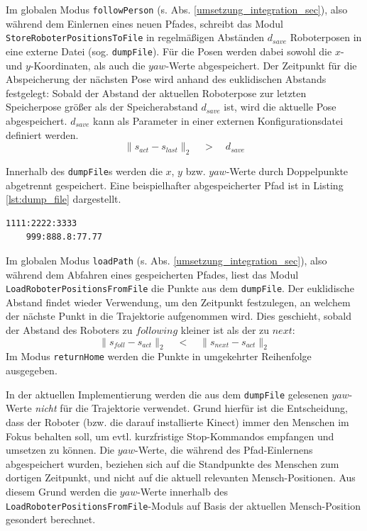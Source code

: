 Im globalen Modus \lstinline{followPerson} (s. Abs. \ref{umsetzung_integration_sec}), also während dem Einlernen eines neuen Pfades, schreibt das Modul \lstinline{StoreRoboterPositionsToFile} in regelmäßigen Abständen $d_{save}$ Roboterposen in eine externe Datei (sog. \lstinline{dumpFile}).
Für die Posen werden dabei sowohl die $x$- und $y$-Koordinaten, als auch die $yaw$-Werte abgespeichert.
Der Zeitpunkt für die Abspeicherung der nächsten Pose wird anhand des euklidischen Abstands festgelegt:
Sobald der Abstand der aktuellen Roboterpose zur letzten Speicherpose größer als der Speicherabstand $d_{save}$ ist, wird die aktuelle Pose abgespeichert.
$d_{save}$ kann als Parameter in einer externen Konfigurationsdatei definiert werden.
\begin{equation}
	\| s_{act} - s_{last}\|_2 \quad > \quad d_{save}
\end{equation}

Innerhalb des \lstinline{dumpFile}s werden die $x$, $y$ bzw. $yaw$-Werte durch Doppelpunkte abgetrennt gespeichert.
Eine beispielhafter abgespeicherter Pfad ist in Listing \ref{lst:dump_file} dargestellt.
\begin{lstlisting}[caption=Beispiel für ein \lstinline{dumpFile} zur Speicherung eines Pfades, label=lst:dump_file]
	1111:2222:3333
	999:888.8:77.77
\end{lstlisting}

Im globalen Modus \lstinline{loadPath} (s. Abs. \ref{umsetzung_integration_sec}), also während dem Abfahren eines gespeicherten Pfades, liest das Modul \lstinline{LoadRoboterPositionsFromFile} die Punkte aus dem \lstinline{dumpFile}.
Der euklidische Abstand findet wieder Verwendung, um den Zeitpunkt festzulegen, an welchem der nächste Punkt in die Trajektorie aufgenommen wird.
Dies geschieht, sobald der Abstand des Roboters zu $following$ kleiner ist als der zu $next$:
\begin{equation}
	\| s_{foll} - s_{act} \|_2 \quad < \quad \| s_{next} - s_{act} \|_2
\end{equation}
Im Modus \lstinline{returnHome} werden die Punkte in umgekehrter Reihenfolge ausgegeben.

In der aktuellen Implementierung werden die aus dem \lstinline{dumpFile} gelesenen $yaw$-Werte \emph{nicht} für die Trajektorie verwendet.
Grund hierfür ist die Entscheidung, dass der Roboter (bzw. die darauf installierte Kinect) immer den Menschen im Fokus behalten soll, um evtl. kurzfristige Stop-Kommandos empfangen und umsetzen zu können.
Die $yaw$-Werte, die während des Pfad-Einlernens abgespeichert wurden, beziehen sich auf die Standpunkte des Menschen zum dortigen Zeitpunkt, und nicht auf die aktuell relevanten Mensch-Positionen. 
Aus diesem Grund werden die $yaw$-Werte innerhalb des \lstinline{LoadRoboterPositionsFromFile}-Moduls auf Basis der aktuellen Mensch-Position gesondert berechnet.

